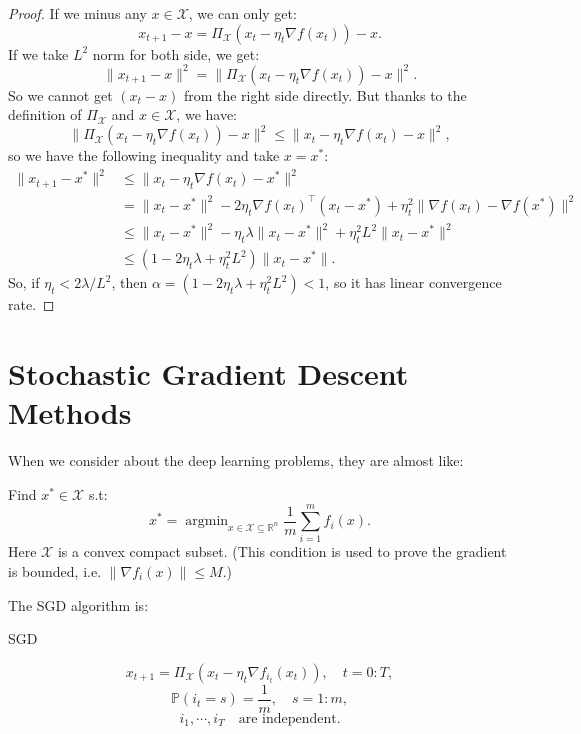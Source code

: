 \begin{proof}
If we minus any $x \in \mathcal{X}$, we can only get:
\begin{equation*}
x_{t+1} - x = \Pi_{\mathcal{X}}(x_{t} - \eta_t \nabla f(x_t)) - x.
\end{equation*}
If we take $L^2$ norm for both side, we get:
\begin{equation*}
\|x_{t+1} - x \|^2 = \| \Pi_{\mathcal{X}}(x_{t} - \eta_t \nabla f(x_t)) - x \|^2.
\end{equation*}
So we cannot get $(x_t - x)$ from the right side directly. But thanks to the definition of $\Pi_{\mathcal{X}}$ and $x \in \mathcal{X}$, we have:
\begin{equation*}
\| \Pi_{\mathcal{X}}(x_{t} - \eta_t \nabla f(x_t)) - x \|^2 \le \|x_{t} - \eta_t \nabla f(x_t) - x\|^2,
\end{equation*}
so we have the following inequality and take $x = x^*$:
\begin{align*}
 \|x_{t+1} - x^* \|^2 &\le  \| x_{t} - \eta_t \nabla f(x_t) - x^* \|^2 \\
 &= \|x_t-x^*\|^2 - 2\eta_t \nabla f(x_t)^\top (x_t - x^*) + \eta_t^2 \|\nabla f(x_t) - \nabla f(x^*)\|^2 \\
 &\le \|x_t - x^*\|^2 - \eta_t \lambda \|x_t - x^*\|^2 + \eta_t ^2 L^2 \|x_t - x^*\|^2  \\
 &\le (1 - 2\eta_t \lambda + \eta_t^2 L^2) \|x_t - x^*\|.
\end{align*}
So, if $\eta_t < 2\lambda/L^2$, then $\alpha = (1 - 2\eta_t \lambda + \eta_t^2 L^2) < 1$, so it has linear convergence rate.
\end{proof}


\section{Stochastic Gradient Descent Methods}
When we consider about the deep learning problems, they are almost like:
\begin{problem}Find ${x}^{*} \in \mathcal{X}$  s.t:
\begin{equation}\label{equ:sum-opt}
{x}^* = \mathop{\arg\min}_{{x} \in \mathcal{X} \subseteq \mathbb{R}^{n}} \frac{1}{m}\sum_{i=1}^m f_i(x).
\end{equation}
Here $\mathcal{X}$ is a convex compact subset. (This condition is used to prove the gradient is bounded, i.e. $\|\nabla f_i(x)\| \le M$.)
\end{problem}
The SGD algorithm is:
\begin{algorithm}\caption{SGD}
\label{alg:SGD}
\begin{equation}\label{equ:sgd-iteration}
x_{t+1} = \Pi_{\mathcal{X}}(x_{t} - \eta_t \nabla f_{i_t}(x_t)), \quad t = 0:T,
\end{equation}
\begin{equation}
\mathbb{P}(i_t = s) = \frac{1}{m}, \quad s = 1:m,
\end{equation}
\begin{equation}
i_1, \cdots, i_T \quad \text{are independent}.
\end{equation}
\end{algorithm}

